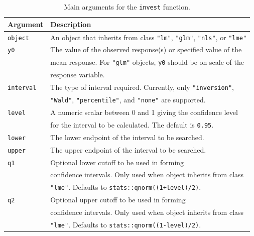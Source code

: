 \documentclass{article}\usepackage[]{graphicx}\usepackage[]{color}
\begin{document}
\begin{table}[!htb]
\begin{tabular}{lp{12cm}}
  \toprule
  Argument    & Description \\
  \midrule
  \texttt{object}        & An object that inherits from class \texttt{"lm"}, \texttt{"glm"}, \texttt{"nls"}, or \texttt{"lme"} \\
  \texttt{y0}            & The value of the observed response(s) or specified value of the \\ & mean response. For \texttt{"glm"} objects, \texttt{y0} should be on scale of the \\ & response variable. \\
  \texttt{interval}      & The type of interval required. Currently, only \texttt{"inversion"}, \\ & \texttt{"Wald"}, \texttt{"percentile"}, and \texttt{"none"} are supported. \\
  \texttt{level}         & A numeric scalar between 0 and 1 giving the confidence level \\ & for the interval to be calculated. The default is \texttt{0.95}. \\
  \texttt{lower}         & The lower endpoint of the interval to be searched. \\
  \texttt{upper} 				 & The upper endpoint of the interval to be searched. \\
  \texttt{q1}            & Optional lower cutoff to be used in forming \\ & confidence intervals. Only used when object inherits from class \\ & \texttt{"lme"}. Defaults to \texttt{stats::qnorm((1+level)/2)}. \\
  \texttt{q2}            & Optional upper cutoff to be used in forming \\ & confidence intervals. Only used when object inherits from class \\ & \texttt{"lme"}. Defaults to \texttt{stats::qnorm((1-level)/2)}. \\
  \bottomrule
\end{tabular}
\caption{Main arguments for the \texttt{invest} function. \label{tab:invest}}
\end{table}
\end{document}
